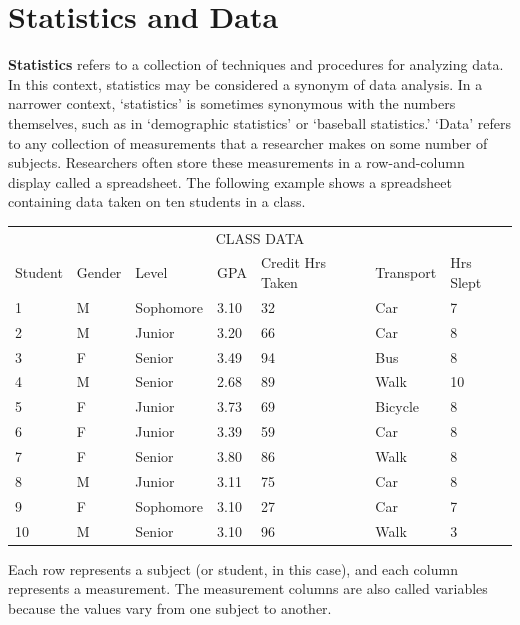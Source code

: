 \documentclass[11pt, chapterprefix=true]{scrbook}\usepackage[]{graphicx}\usepackage[]{color}
\begin{document}
\section{Statistics and Data}

\textbf{Statistics} refers to a collection of techniques and procedures for analyzing data.  In this context, statistics may be considered a synonym of data analysis.  In a narrower context, `statistics' is sometimes synonymous with the numbers themselves, such as in `demographic statistics' or `baseball statistics.'  `Data' refers to any collection of measurements that a researcher makes on some number of subjects.  Researchers often store these measurements in a row-and-column display called a spreadsheet.  The following example shows a spreadsheet containing data taken on ten students in a class.

  \begin{table}[htbp]
   \centering
  \begin{tabular}{@{} p{14mm} p{13mm} p{20mm} p{9mm} p{32mm} p{18mm} p{21mm} @{}} \hline %
   \multicolumn{7}{c}{CLASS DATA} \\
   Student & Gender & Level & GPA & Credit Hrs Taken & Transport & Hrs Slept \\ \hline
   1 & M & Sophomore & 3.10 & 32 & Car & 7 \\
   2 & M & Junior & 3.20 & 66 & Car & 8 \\
   3 & F & Senior & 3.49 & 94 & Bus & 8 \\
   4 & M & Senior & 2.68 & 89 & Walk & 10 \\
   5 & F & Junior & 3.73 & 69 & Bicycle & 8 \\
   6 & F & Junior & 3.39 & 59 & Car & 8 \\
   7 & F & Senior & 3.80 & 86 & Walk & 8 \\
   8 & M & Junior & 3.11 & 75 & Car & 8 \\
   9 & F & Sophomore & 3.10 & 27 & Car & 7 \\
   10 & M & Senior & 3.10 & 96 & Walk & 3 \\ \hline
   \end{tabular}
   \end{table}

Each row represents a subject (or student, in this case), and each column represents a measurement.  The measurement columns are also called variables because the values vary from one subject to another.
\end{document}
